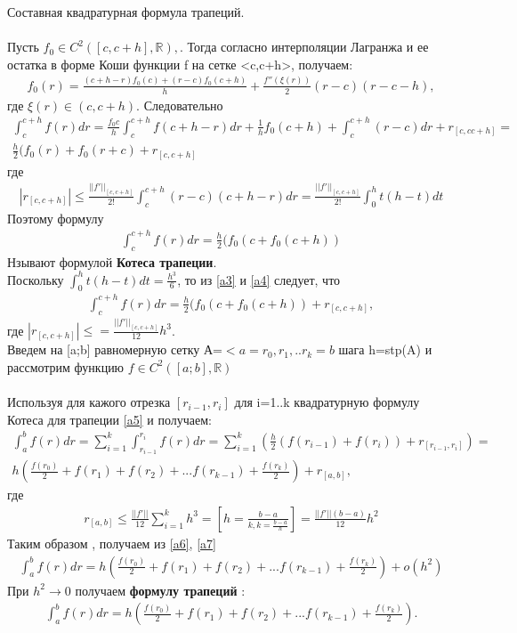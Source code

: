 \documentclass[__main__.tex]{subfiles}
\begin{document}
Составная квадратурная формула трапеций.\\
\\
Пусть $f_{0}\in C^{2}([c,c+h],\mathbb{R}),$. Тогда согласно интерполяции Лагранжа и ее остатка в форме Коши функции f на сетке <c,c+h>, получаем:
\begin{gather}
	\label{a1}
	f_{0}(r)=\frac{(c+h-r)f_{0}(c)+(r-c)f_{0}(c+h)}{h}+\frac{f''(\xi(r))}{2}(r-c)(r-c-h),
	\end{gather}
где $\xi(r)\in (c,c+h)$.
Следовательно 
\begin{gather}
	\label{a2}
	\int_{c}^{c+h}f(r)dr=\frac{f_{0}c}{h}\int_{c}^{c+h}f(c+h-r)dr+\frac{1}{h}f_{0}(c+h)+\int_{c}^{c+h}(r-c)dr+r_{[c,cc+h]}= \\ \frac{h}{2}(f_{0}(r)+f_{0}(r+c)+r_{[c,c+h]}
	\end{gather}
где
\begin{gather}
	\label{a3}
|r_{[c,c+h]}|\leq\frac{||f'||_{[c,c+h]}}{2!}\int_{c}^{c+h}(r-c)(c+h-r)dr=\frac{||f'||_{[c,c+h]}}{2!}\int_{0}^{h}t(h-t)dt
\end{gather}
Поэтому формулу 
\begin{gather}
	\label{a4}
	\int_{c}^{c+h}f(r)dr=\frac{h}{2}(f_{0}(c+f_{0}(c+h))
\end{gather}
Нзывают формулой \textbf{Котеса трапеции}.\\
Поскольку $\int_{0}^{h}t(h-t)dt=\frac{h^{3}}{6}$, то из \ref{a3} и \ref{a4} следует, что
	\begin{gather}
		\label{a5}
			\int_{c}^{c+h}f(r)dr=\frac{h}{2}(f_{0}(c+f_{0}(c+h))+r_{[c,c+h]},
		\end{gather}
где $|r_{[c,c+h]}|\leq=\frac{||f'||_{[c,c+h]}}{12}h^{3}$.\\
Введем на [a;b] равномерную сетку А=$<a=r_{0},r_{1},..r_{k}=b$ шага h=stp(A) и рассмотрим функцию $f\in C^{2}([a;b],\mathbb{R})$\\ \\
Используя для кажого отрезка $[r_{i-1},r_{i}]$ для i=1..k квадратурную формулу Котеса для трапеции \ref{a5} и получаем:\\
\begin{gather}
	\label{a6}
	\int_{a}^{b}f(r)dr=\sum_{i=1}^{k}\int_{r_{i-1}}^{r_{i}}f(r)dr=\sum_{i=1}^{k}(\frac{h}{2}(f(r_{i-1})+f(r_{i}))+r_{[r_{i-1},r_{i}]})= \\h(\frac{f(r_{0})}{2}+f(r_{1})+f(r_{2})+...f(r_{k-1})+\frac{f(r_{k})}{2})+r_{[a,b]},
	\end{gather}
где 
\begin{gather}
	\label{a7}
	r_{[a,b]}\leq\frac{||f'||}{12}\sum_{i=1}^{k}h^{3}=[ h=\frac{b-a}{k, k=\frac{b-a}{h}}  ]= \frac{||f'||(b-a)}{12} h^{2}
	\end{gather}
Таким образом , получаем из \ref{a6}, \ref{a7} 
\begin{gather}
	\label{a8}
	\int_{a}^{b}f(r)dr=h(\frac{f(r_{0})}{2}+f(r_{1})+f(r_{2})+...f(r_{k-1})+\frac{f(r_{k})}{2})+o(h^{2})
\end{gather}
  При  $h^{2}\rightarrow$0 получаем \textbf{формулу трапеций }:
  \begin{gather}
  	\label{a9}
  	\int_{a}^{b}f(r)dr=h(\frac{f(r_{0})}{2}+f(r_{1})+f(r_{2})+...f(r_{k-1})+\frac{f(r_{k})}{2}).
  \end{gather}
\end{document}
